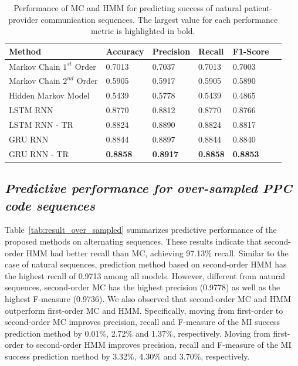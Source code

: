 \documentclass{amia_summit_2018}
\begin{document}
\begin{table}[h]
\centering
\caption{Performance of MC and HMM for predicting success of natural patient-provider communication sequences. The largest value for each performance metric is highlighted in bold.}
\label{tab:result_under_sampled}
  \begin{tabular}{|l|l|l|l|l|l|}
  \hline
   \textbf{Method} & \textbf{Accuracy}  & \textbf{Precision}  & \textbf{Recall} & \textbf{F1-Score}\\ \hline    
    
 Markov Chain $1^{st}$ Order & 0.7013 & 0.7037 & 0.7013 & 0.7003\\ \hline
 Markov Chain $2^{nd}$ Order & 0.5905 & 0.5917 & 0.5905 & 0.5890\\ \hline
 Hidden Markov Model & 0.5439 & 0.5778 & 0.5439 & 0.4865\\ \hline
 LSTM RNN & 0.8770 & 0.8812 & 0.8770 & 0.8766\\ \hline
 LSTM RNN - TR & 0.8824 & 0.8890 & 0.8824 & 0.8817\\ \hline
 GRU RNN & 0.8844 & 0.8897 & 0.8844 & 0.8840\\ \hline
 GRU RNN - TR & \textbf{0.8858} & \textbf{0.8917} & \textbf{0.8858} & \textbf{0.8853}\\ \hline 
  \end{tabular}
\end{table} 

\subsection*{\textit{Predictive performance for over-sampled PPC code sequences}}
Table~\ref{tab:result_over_sampled} summarizes predictive performance of the proposed methods on alternating sequences. These results indicate that second-order HMM had better recall than MC, achieving 97.13\% recall. Similar to the case of natural sequences, prediction method based on second-order HMM has the highest recall of 0.9713 among all models. However, different from natural sequences, second-order MC has the highest precision (0.9778) as well as the highest F-measure (0.9736). We also observed that second-order MC and HMM outperform first-order MC and HMM. Specifically, moving from first-order to second-order MC improves precision, recall and F-measure of the MI success prediction method by 0.01\%, 2.72\% and 1.37\%, respectively. Moving from first-order to second-order HMM improves precision, recall and F-measure of the MI success prediction method by 3.32\%, 4.30\% and 3.70\%, respectively.\\
\end{document}
